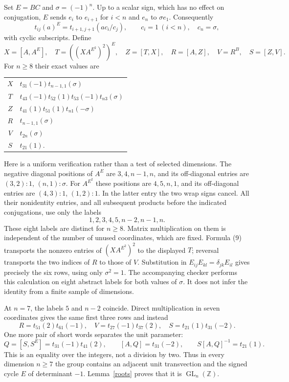 \documentclass[11pt,a4paper]{article}
\newcommand{\GL}{\operatorname{GL}}\newcommand{\SL}{\operatorname{SL}}
\begin{document}
Set $E=BC$ and $\sigma=(-1)^n$. Up to a scalar sign, which has no
effect on conjugation, $E$ sends $e_i$ to $e_{i+1}$ for $i<n$ and
$e_n$ to $\sigma e_1$. Consequently
\[
 t_{ij}(a)^E=t_{i+1,j+1}(a c_i/c_j),\qquad
 c_i=1\ (i<n),\quad c_n=\sigma,                         \tag{9}
\]
with cyclic subscripts. Define
\[
 X=[A,A^E],\quad T=((XA^{E^2})^2)^E,\quad Z=[T,X],\quad
 R=[A,Z],\quad V=R^B,\quad S=[Z,V].                    \tag{10}
\]
For $n\ge8$ their exact values are
\begin{center}\small
\begin{tabular}{c|l}
$X$&$t_{31}(-1)t_{n-1,1}(\sigma)$\\
$T$&$t_{43}(-1)t_{52}(1)t_{53}(-1)t_{n3}(\sigma)$\\
$Z$&$t_{41}(1)t_{51}(1)t_{n1}(-\sigma)$\\
$R$&$t_{n-1,1}(\sigma)$\\
$V$&$t_{2n}(\sigma)$\\
$S$&$t_{21}(1)$.
\end{tabular}
\end{center}
Here is a uniform verification rather than a test of selected dimensions.
The negative diagonal positions of $A^E$ are $3,4,n-1,n$, and
its off-diagonal entries are $(3,2):1$, $(n,1):\sigma$.
For $A^{E^2}$ these positions are $4,5,n,1$, and its off-diagonal
entries are $(4,3):1$, $(1,2):1$. In the latter entry the two wrap
signs cancel. All their nonidentity
entries, and all subsequent products before the indicated conjugations,
use only the labels
\[
                       1,2,3,4,5,n-2,n-1,n.             \tag{11}
\]
These eight labels are distinct for $n\ge8$. Matrix multiplication
on them is independent of the number of unused coordinates, which
are fixed. Formula (9) transports the nonzero entries of
$(XA^{E^2})^2$ to the displayed $T$; reversal transports the two
indices of $R$ to those of $V$. Substitution in
$E_{ij}E_{kl}=\delta_{jk}E_{il}$ gives precisely the six rows,
using only $\sigma^2=1$. The accompanying checker performs this
calculation on eight abstract labels for both values of $\sigma$.
It does not infer the identity from a finite sample of dimensions.

At $n=7$, the labels $5$ and $n-2$ coincide. Direct multiplication
in seven coordinates gives the same first three rows and instead
\[
 R=t_{51}(2)t_{61}(-1),\quad
 V=t_{27}(-1)t_{37}(2),\quad
 S=t_{21}(1)t_{31}(-2).
\]
One more pair of short words separates the unit parameter:
\[
 Q=[S,S^E]=t_{31}(-1)t_{41}(2),\qquad
 [A,Q]=t_{31}(-2),\qquad S[A,Q]^{-1}=t_{21}(1).        \tag{12}
\]
This is an equality over the integers, not a division by two.
Thus in every dimension $n\ge7$ the group contains an adjacent unit
transvection and the signed cycle $E$ of determinant $-1$.
Lemma~\ref{roots} proves that it is $\GL_n(\mathbb Z)$.
\end{document}
